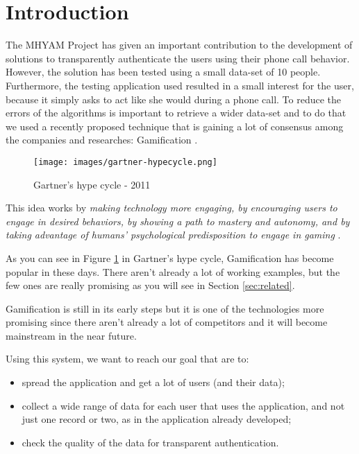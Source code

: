\section{Introduction} 	
The MHYAM Project \cite{MHYAM} has given an important contribution to the development of solutions to transparently authenticate the users using their phone call behavior. However, the solution has been tested using a small data-set of 10 people. Furthermore, the testing application used resulted in a small interest for the user, because it simply asks to act like she would during a phone call. To reduce the errors of the algorithms is important to retrieve a wider data-set and to do that we used a recently proposed technique that is gaining a lot of consensus among the companies and researches: Gamification \cite{website:gamification-wikipedia}. 

\begin{figure}[H]
\centering %
\texttt{[image: images/gartner-hypecycle.png]}
\caption{Gartner's hype cycle - 2011}
\label{fig:GamificationHypeCycle}
\end{figure}

This idea works by \textit{making technology more engaging, by encouraging users to engage in desired behaviors, by showing a path to mastery and autonomy, and by taking advantage of humans' psychological predisposition to engage in gaming} \cite{website:gamification-wikipedia}.

As you can see in Figure \ref{fig:GamificationHypeCycle} in Gartner's hype cycle, Gamification has become popular in these days. There aren't already a lot of working examples, but the few ones are really promising as you will see in Section \ref{sec:related}.

Gamification is still in its early steps but it is one of the technologies more promising since there aren't already a lot of competitors and it will become mainstream in the near future.

Using this system, we want to reach our goal that are to:
\begin{itemize}
\item spread the application and get a lot of users (and their data);
\item collect a wide range of data for each user that uses the application, and not just one record or two, as in the application already developed;
\item check the quality of the data for transparent authentication.
\end{itemize}

